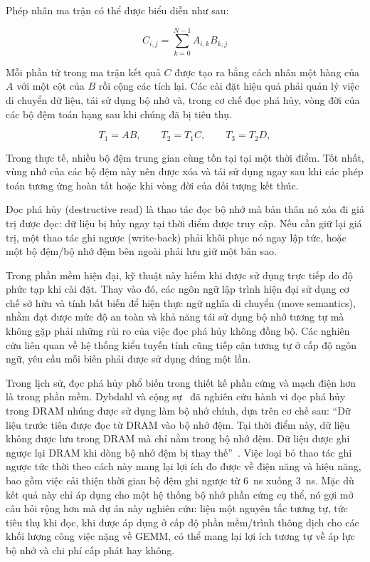 \documentclass[a4paper]{article}
\begin{document}
	Phép nhân ma trận có thể được biểu diễn như sau:
	
	\begin{equation}
		C_{i,j} = \sum_{k=0}^{N-1} A_{i,k}B_{k,j}
	\end{equation}
	
	Mỗi phần tử trong ma trận kết quả $C$ được tạo ra bằng cách nhân một hàng của $A$ với một cột của $B$ rồi cộng các tích lại. Các cài đặt hiệu quả phải quản lý việc di chuyển dữ liệu, tái sử dụng bộ nhớ và, trong cơ chế đọc phá hủy, vòng đời của các bộ đệm toán hạng sau khi chúng đã bị tiêu thụ.
	
	\begin{equation}
	T_1 = A B,\qquad
	T_2 = T_1 C,\qquad
	T_3 = T_2 D,
	\end{equation}
	
	Trong thực tế, nhiều bộ đệm trung gian cùng tồn tại tại một thời điểm. Tốt nhất, vùng nhớ của các bộ đệm này nên được xóa và tái sử dụng ngay sau khi các phép toán tương ứng hoàn tất hoặc khi vòng đời của đối tượng kết thúc.
	
	
	Đọc phá hủy (destructive read) là thao tác đọc bộ nhớ mà bản thân nó xóa đi giá trị được đọc: dữ liệu bị hủy ngay tại thời điểm được truy cập. Nếu cần giữ lại giá trị, một thao tác ghi ngược (write-back) phải khôi phục nó ngay lập tức, hoặc một bộ đệm/bộ nhớ đệm bên ngoài phải lưu giữ một bản sao.
	
	Trong phần mềm hiện đại, kỹ thuật này hiếm khi được sử dụng trực tiếp do độ phức tạp khi cài đặt. Thay vào đó, các ngôn ngữ lập trình hiện đại sử dụng cơ chế sở hữu và tính bất biến để hiện thực ngữ nghĩa di chuyển (move semantics), nhằm đạt được mức độ an toàn và khả năng tái sử dụng bộ nhớ tương tự mà không gặp phải những rủi ro của việc đọc phá hủy không đồng bộ. Các nghiên cứu liên quan về hệ thống kiểu tuyến tính cũng tiếp cận tương tự ở cấp độ ngôn ngữ, yêu cầu mỗi biến phải được sử dụng đúng một lần.
	
	Trong lịch sử, đọc phá hủy phổ biến trong thiết kế phần cứng và mạch điện hơn là trong phần mềm. Dybdahl và cộng sự~\cite{DybdahlKGN06} đã nghiên cứu hành vi đọc phá hủy trong DRAM nhúng được sử dụng làm bộ nhớ chính, dựa trên cơ chế sau: ``Dữ liệu trước tiên được đọc từ DRAM vào bộ nhớ đệm. Tại thời điểm này, dữ liệu không được lưu trong DRAM mà chỉ nằm trong bộ nhớ đệm. Dữ liệu được ghi ngược lại DRAM khi dòng bộ nhớ đệm bị thay thế''~\cite{DybdahlKGN06}. Việc loại bỏ thao tác ghi ngược tức thời theo cách này mang lại lợi ích đo được về điện năng và hiệu năng, bao gồm việc cải thiện thời gian bộ đệm ghi ngược từ 6~ns xuống 3~ns. Mặc dù kết quả này chỉ áp dụng cho một hệ thống bộ nhớ phần cứng cụ thể, nó gợi mở câu hỏi rộng hơn mà dự án này nghiên cứu: liệu một nguyên tắc tương tự, tức tiêu thụ khi đọc, khi được áp dụng ở cấp độ phần mềm/trình thông dịch cho các khối lượng công việc nặng về GEMM, có thể mang lại lợi ích tương tự về áp lực bộ nhớ và chi phí cấp phát hay không.
	
\end{document}
